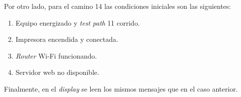 \pagebreak

Por otro lado, para el camino 14 las condiciones iniciales son las siguientes:
\begin{enumerate}
	\item Equipo energizado y \textit{test path} 11 corrido.
	\item Impresora encendida y conectada.
	\item \textit{Router} Wi-Fi funcionando.
	\item Servidor web no disponible.
\end{enumerate}

Finalmente, en el \textit{display} se leen los mismos mensajes que en el caso anterior.